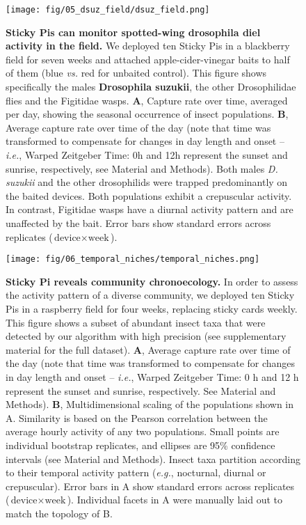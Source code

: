 \documentclass[fleqn,10pt]{wlscirep}
\begin{document}
\pagebreak

\begin{figure}[ht]
	\centering
	\texttt{[image: fig/05\_dsuz\_field/dsuz\_field.png]}
	\caption{\textbf{Sticky Pis can monitor spotted-wing drosophila diel activity in the field.} We deployed ten Sticky Pis in a blackberry field for seven weeks and attached apple-cider-vinegar baits to half of them (blue \emph{vs.} red for unbaited control). This figure shows specifically the males \textbf{Drosophila suzukii}, the other Drosophilidae flies and the Figitidae wasps. \textbf{A}, Capture rate over time, averaged per day, showing the seasonal occurrence of insect populations. \textbf{B}, Average capture rate over time of the day (note that time was transformed to compensate for changes in day length and onset – \emph{i.e.}, Warped Zeitgeber Time: 0h and 12h represent the sunset and sunrise, respectively, see Material and Methods). Both males \emph{D. suzukii} and the other drosophilids were trapped predominantly on the baited devices. Both populations exhibit a crepuscular activity. In contrast, Figitidae wasps have a diurnal activity pattern and are unaffected by the bait. Error bars show standard errors across replicates ($\text{device} \times{} \text{week}$).}
	\label{fig:05}
\end{figure}

\pagebreak

\begin{figure}[ht]
	\centering
	\texttt{[image: fig/06\_temporal\_niches/temporal\_niches.png]}
	\caption{\textbf{Sticky Pi reveals community chronoecology.} In order to assess the activity pattern of a diverse community, we deployed ten Sticky Pis in a raspberry field for four weeks, replacing sticky cards weekly. This figure shows a subset of abundant insect taxa that were detected by our algorithm with high precision (see supplementary material for the full dataset). \textbf{A}, Average capture rate over time of the day (note that time was transformed to compensate for changes in day length and onset – \emph{i.e.}, Warped Zeitgeber Time: 0 h and 12 h represent the sunset and sunrise, respectively. See Material and Methods). \textbf{B}, Multidimensional scaling of the populations shown in A. Similarity is based on the Pearson correlation between the average hourly activity of any two populations. Small points are individual bootstrap replicates, and ellipses are 95\% confidence intervals (see Material and Methods). Insect taxa partition according to their temporal activity pattern (\emph{e.g.}, nocturnal, diurnal or crepuscular). Error bars in A show standard errors across replicates ($\text{device} \times{} \text{week}$). Individual facets in A were manually laid out to match the topology of B.}
	\label{fig:06}
\end{figure}
\pagebreak
\end{document}
